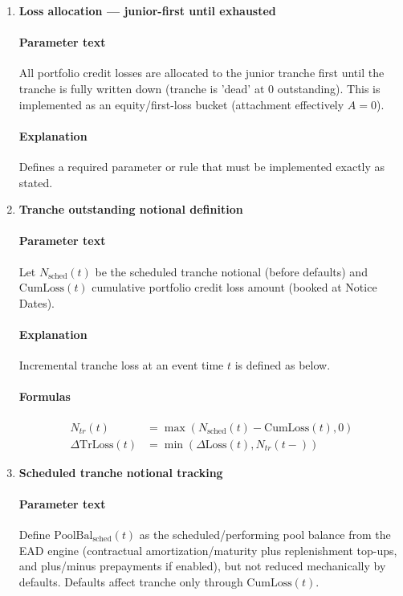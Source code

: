 \documentclass[11pt]{article}
\begin{document}
\begin{enumerate}[label=\arabic*),leftmargin=*,align=left]
\paragraph{Explanation} Defines a required parameter or rule that must be implemented exactly as stated.

\item \textbf{Loss allocation — junior-first until exhausted}
\paragraph{Parameter text} All portfolio credit losses are allocated to the junior tranche first until the tranche is fully written down (tranche is 'dead' at 0 outstanding). This is implemented as an equity/first-loss bucket (attachment effectively $A = 0$).
\paragraph{Explanation} Defines a required parameter or rule that must be implemented exactly as stated.

\item \textbf{Tranche outstanding notional definition}
\paragraph{Parameter text} Let $N_{\text{sched}}(t)$ be the scheduled tranche notional (before defaults) and $\text{CumLoss}(t)$ cumulative portfolio credit loss amount (booked at Notice Dates). 
\paragraph{Explanation} Incremental tranche loss at an event time $t$ is defined as below.
\paragraph{Formulas}
\begin{align*}
N_{tr}(t) &= \max(N_{\text{sched}}(t) - \text{CumLoss}(t), 0) \\
\Delta \text{TrLoss}(t) &= \min(\Delta \text{Loss}(t), N_{tr}(t-))
\end{align*}

\item \textbf{Scheduled tranche notional tracking}
\paragraph{Parameter text} Define $\text{PoolBal}_{\text{sched}}(t)$ as the scheduled/performing pool balance from the EAD engine (contractual amortization/maturity plus replenishment top-ups, and plus/minus prepayments if enabled), but not reduced mechanically by defaults. Defaults affect tranche only through $\text{CumLoss}(t)$.

\end{enumerate}
\end{document}
